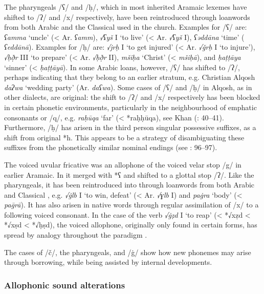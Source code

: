 \documentclass[output=paper]{langsci/langscibook}
\begin{document}
The {pharyngeals} /ʕ/ and /ḥ/, which in most inherited Aramaic lexemes have shifted to /ʔ/ and /x/ respectively, have been reintroduced through {loanwords} from both Arabic and the Classical  used in the church. Examples for /ʕ/ are: \textit{ʕamma} ‘uncle’ (< Ar. \textit{ʕamm}), \textit{√ʕyš} I ‘to live’ (< Ar. \textit{√ʕyš} I), \textit{ʕəddāna} ‘time’ ( \textit{ʕeddānā}). Examples for /ḥ/ are: \textit{√jrḥ} I ‘to get injured’ (< Ar. \textit{√ǧrḥ} I ‘to injure’), \textit{√ḥð̣r} III ‘to prepare’ (<  Ar. \textit{√ḥð̣r} II), \textit{mšiḥa} ‘Christ’ (<  \textit{mšiḥā}), and \textit{ḥaṭṭāya} ‘sinner’ (<  \textit{ḥaṭṭāyā}). In some Arabic loans, however, /ʕ/ has shifted to /ʔ/, perhaps indicating that they belong to an earlier stratum, e.g. Christian Alqosh \textit{daʔwa} ‘wedding party’ (Ar. \textit{daʕwa}). Some cases of /ʕ/ and /ḥ/ in Alqosh, as in other  dialects, are original: the shift to /ʔ/ and /x/ respectively has been blocked in certain phonetic environments, particularly in the neighbourhood of {emphatic consonants} or /q/, e.g. \textit{raḥūqa} ‘far’ (< *raḥḥūqa), see Khan (\citeyear{Khan2002}: 40–41). Furthermore, /ḥ/ has arisen in the third person singular possessive suffixes, as a shift from original *h. This appears to be a strategy of disambiguating these suffixes from the phonetically similar nominal endings (see \citealt{Coghill2008}: 96–97).

The voiced uvular fricative was an allophone of the voiced velar stop /g/ in earlier Aramaic. In  it {merged} with *ʕ and shifted to a glottal stop /ʔ/. Like the {pharyngeals}, it has been reintroduced into  through {loanwords} from both Arabic and Classical , e.g. \textit{√\.glb} I ‘to win, defeat’ (< Ar. \textit{√ɣlb} I) and \textit{pa\.gra} ‘body’ (<  \textit{pa\={g}rā}). It has also arisen in native words through regular assimilation of /x/ to a following voiced consonant. In the case of the verb \textit{√\.gẓd} I ‘to reap’ (< *√xẓd < *√xṣd  < *√ḥṣd), the voiced allophone, originally only found in certain forms, has spread by {analogy} throughout the paradigm \citep[20]{Coghill2004}.

The cases of /č/, the {pharyngeals}, and /\.g/ show how new phonemes may arise through borrowing, while being assisted by internal developments.

\subsubsection{Allophonic sound alterations}
\end{document}
